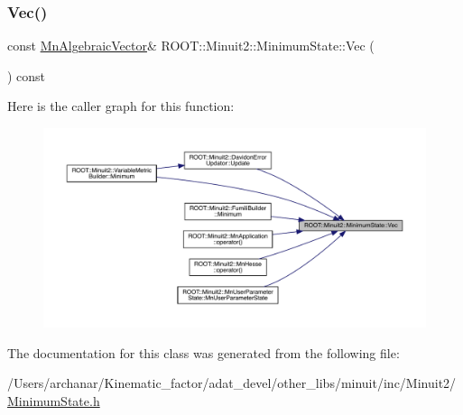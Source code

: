 \mbox{\label{classROOT_1_1Minuit2_1_1MinimumState_a0c7ad9c9226473f87b1bbb15ed87bbcd}} 
\subsubsection{\texorpdfstring{Vec()}{Vec()}\hspace{0.1cm}{\footnotesize\ttfamily [2/2]}}
{\footnotesize\ttfamily const \mbox{\hyperlink{namespaceROOT_1_1Minuit2_a62ed97730a1ca8d3fbaec64a19aa11c9}{Mn\+Algebraic\+Vector}}\& R\+O\+O\+T\+::\+Minuit2\+::\+Minimum\+State\+::\+Vec (\begin{DoxyParamCaption}{ }\end{DoxyParamCaption}) const\hspace{0.3cm}{\ttfamily [inline]}}

Here is the caller graph for this function\+:\nopagebreak
\begin{figure}[H]
\begin{center}
\leavevmode
\includegraphics[width=350pt]{db/dcd/classROOT_1_1Minuit2_1_1MinimumState_a0c7ad9c9226473f87b1bbb15ed87bbcd_icgraph}
\end{center}
\end{figure}


The documentation for this class was generated from the following file\+:\begin{DoxyCompactItemize}
\item 
/\+Users/archanar/\+Kinematic\+\_\+factor/adat\+\_\+devel/other\+\_\+libs/minuit/inc/\+Minuit2/\mbox{\hyperlink{other__libs_2minuit_2inc_2Minuit2_2MinimumState_8h}{Minimum\+State.\+h}}\end{DoxyCompactItemize}
